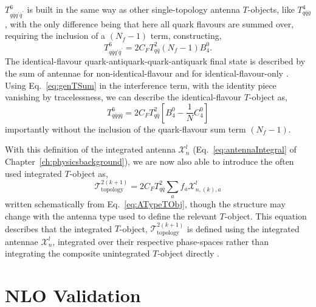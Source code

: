 $T_{q\bar qq^\prime\bar q^\prime}^6$ is built in the same way as other single-topology
antenna $T$-objects, like $T_{q\bar qg}^4$, with the only difference being that
here all quark flavours are summed over, requiring the inclusion of a $(N_f-1)$
term, constructing,
\begin{equation}
    T_{q\bar qq^\prime\bar q^\prime}^6=2C_FT_{q\bar q}^2(N_f-1)B_4^0.
\end{equation}
The identical-flavour quark-antiquark-quark-antiquark final state is described by
the sum of antennae for non-identical-flavour and for identical-flavour-only
\cite{Gehrmann-DeRidder:2005btv}. Using Eq.~\eqref{eq:genTSum} in the interference
term, with the identity piece vanishing by tracelessness,
we can describe the
identical-flavour $T$-object as,
\begin{equation}
    T_{q\bar q q\bar q}^6 = 2C_FT_{q\bar q}^2\left[B_4^0-\frac1N C_4^0\right]
\end{equation}
importantly without the inclusion of the quark-flavour sum term $(N_f-1)$.

With this definition of the integrated antenna $\mathcal X_n^l$ (Eq.~\eqref{eq:antennaIntegral}
of Chapter~\ref{ch:physicsbackground}), we are now also able to introduce the often used
integrated $T$-object as,
\begin{equation}\label{eq:integratedT}
    \mathcal T_\text{topology}^{2(k+1)} = 2C_FT_{q\bar q}^2\sum_a f_a \mathcal X_{n,(k),a}^l
\end{equation}
written schematically from Eq.~\eqref{eq:ATypeTObj}, though the structure may change
with the antenna type used to define the relevant $T$-object. This equation describes
that the integrated $T$-object, $\mathcal T_\text{topology}^{2(k+1)}$ is defined
using the integrated antennae $\mathcal X_n^l$, integrated over their respective
phase-spaces rather than integrating the composite unintegrated $T$-object directly
\cite{Gehrmann-DeRidder:2005btv,Gehrmann-DeRidder:2004ttg}.

\fi

\section{NLO Validation}\label{sec:rratioNLO}

